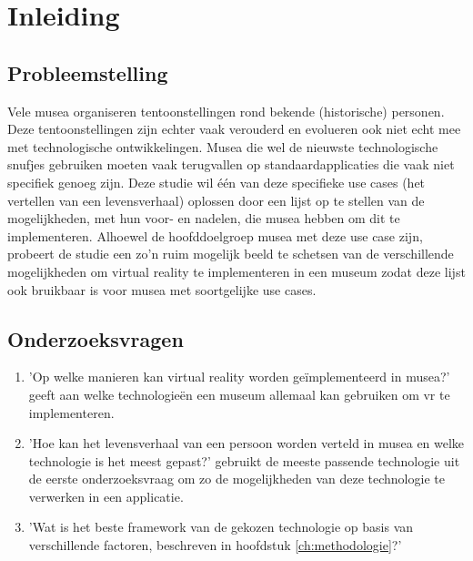 
\chapter{Inleiding}
\label{ch:inleiding}

\section{Probleemstelling}
\label{sec:probleemstelling}

Vele musea organiseren tentoonstellingen rond bekende (historische) personen. Deze tentoonstellingen zijn echter vaak verouderd en evolueren ook niet echt mee met technologische ontwikkelingen. Musea die wel de nieuwste technologische snufjes gebruiken moeten vaak terugvallen op standaardapplicaties die vaak niet specifiek genoeg zijn. Deze studie wil één van deze specifieke use cases (het vertellen van een levensverhaal) oplossen door een lijst op te stellen van de mogelijkheden, met hun voor- en nadelen, die musea hebben om dit te implementeren. Alhoewel de hoofddoelgroep musea met deze use case zijn, probeert de studie een zo'n ruim mogelijk beeld te schetsen van de verschillende mogelijkheden om virtual reality te implementeren in een museum zodat deze lijst ook bruikbaar is voor musea met soortgelijke use cases.

\section{Onderzoeksvragen}
\label{sec:onderzoeksvraag}

\begin{enumerate}
    \item 'Op welke manieren kan virtual reality worden geïmplementeerd in musea?' geeft aan welke technologieën een museum allemaal kan gebruiken om \acrshort{vr} te implementeren.
    \item 'Hoe kan het levensverhaal van een persoon worden verteld in musea en welke technologie is het meest gepast?' gebruikt de meeste passende technologie uit de eerste onderzoeksvraag om zo de mogelijkheden van deze technologie te verwerken in een applicatie.
    \item 'Wat is het beste framework van de gekozen technologie op basis van verschillende factoren, beschreven in hoofdstuk \ref{ch:methodologie}?' 
\end{enumerate}

